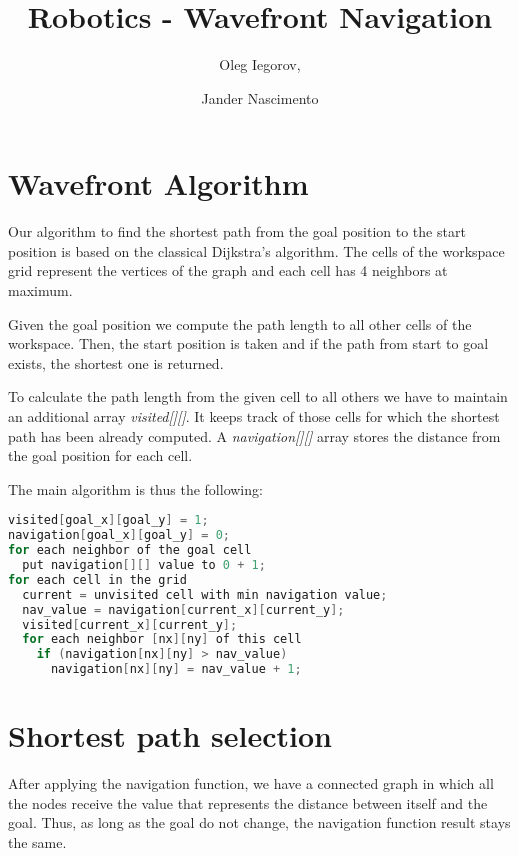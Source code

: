 \documentclass{article}
\begin{document}
\title{Robotics - Wavefront Navigation}

\author{Oleg Iegorov, 
\and Jander Nascimento}

\maketitle

\section{Wavefront Algorithm}

Our algorithm to find the shortest path from the goal
position to the start position is based on the classical Dijkstra's
algorithm. The cells of the workspace grid represent the vertices of the
graph and each cell has 4 neighbors at maximum.

Given the goal position we compute the path length to all other cells
of the workspace. Then, the start position is taken and if the path from
start to goal exists, the shortest one is returned.

To calculate the path length from the given cell to all others we have
to maintain an additional array \emph{visited[][]}. It keeps track of
those cells for which the shortest path has been already computed.  A
\emph{navigation[][]} array stores the distance from the goal position for
each cell.

The main algorithm is thus the following:

\begin{lstlisting}[language=C]
visited[goal_x][goal_y] = 1;
navigation[goal_x][goal_y] = 0;
for each neighbor of the goal cell
  put navigation[][] value to 0 + 1;
for each cell in the grid
  current = unvisited cell with min navigation value;
  nav_value = navigation[current_x][current_y];
  visited[current_x][current_y];
  for each neighbor [nx][ny] of this cell
    if (navigation[nx][ny] > nav_value)
      navigation[nx][ny] = nav_value + 1;
\end{lstlisting}

\section{Shortest path selection}

After applying the navigation function, we have a connected graph in which
all the nodes receive the value that represents the distance between
itself and the goal. Thus, as long as the goal do not change, the
navigation function result stays the same.
 
\end{document}

